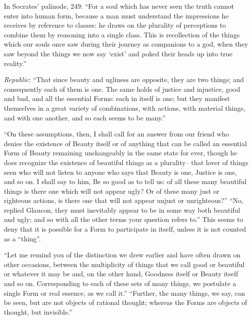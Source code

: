 \documentclass{article}
\theoremstyle{definition}
\begin{document}
In Socrates' palinode, 249: ``For a soul which has never seen the truth cannot enter into human form, because a man must understand the impressions he receives
by reference to classes: he draws on the plurality of perceptions to combine them by reasoning into a single class. This is recollection of the things which our souls once
saw during their journey as companions to a god, when they saw beyond the things we now say `exist' and poked their heads up into true reality.'' \cite[p.~32]{waterfieldphaedrus}


{\em Republic}:
``That since beauty and ugliness are opposite, they are two things; and consequently each of them is one. The same holds
of justice and injustice, good and bad, and all the essential Forms: each in itself is one; but they manifest themselves in a great variety
of combinations, with actions, with material things, and with one another, and so each seems to be
many.''\cite[p.~183, 475--476]{cornfordrepublic}

``On these assumptions, then, I shall call for an answer from our friend who denies the existence of Beauty itself
or of anything that can be called an essential Form of Beauty remaining unchangeably in the same state for ever, though he does
recognize the existence of beautiful things as a plurality-- that lover of things seen who will not listen to anyone who says that Beauty
is one, Justice is one, and so on. I shall say to him, Be so good as to tell us: of all these many beautiful things is there one which will
not appear ugly? Or of these many  just or righteous actions, is there one that will not appear unjust or unrighteous?'' ``No, replied
Glaucon, they must inevitably appear to be in some way both beautiful and ugly; and so with all the other terms your question
refers to.'' \cite[p.~187, 478--479]{cornfordrepublic} This seems to deny that it is possible for a Form to participate in itself,
unless it is not counted as a ``thing''.

 ``Let me remind you of the distinction we drew earlier and have often drawn on other
occasions, between the multiplicity of things that we call good or beautiful or whatever it may be and, on the other hand,
Goodness itself or Beauty itself and so on. Corresponding to each of these sets of many things, we postulate a single Form
or real essence, as we call it.'' ``Further, the many things, we say, can be seen, but are not objects of rational thought; whereas
the Forms are objects of thought, but invisible.'' \cite[pp.~217--218, 506--507]{cornfordrepublic}
\end{document}
